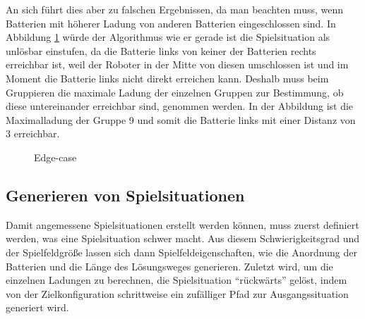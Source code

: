 \documentclass[a4paper,10pt,ngerman]{scrartcl}
\begin{document}
An sich führt dies aber zu falschen Ergebnissen, da man beachten muss, wenn Batterien mit höherer Ladung von anderen Batterien eingeschlossen sind.
In Abbildung \ref{fig:groupingedgecase} würde der Algorithmus wie er gerade ist die Spielsituation als unlösbar einstufen,
da die Batterie links von keiner der Batterien rechts erreichbar ist,
weil der Roboter in der Mitte von diesen umschlossen ist und im Moment die Batterie links nicht direkt erreichen kann.
Deshalb muss beim Gruppieren die maximale Ladung der einzelnen Gruppen zur Bestimmung, ob diese untereinander erreichbar sind, genommen werden.
In der Abbildung ist die Maximalladung der Gruppe 9 und somit die Batterie links mit einer Distanz von 3 erreichbar.

\begin{figure}[ht]
  \centering
  \caption{Edge-case}
  \label{fig:groupingedgecase}
\end{figure}

\subsection{Generieren von Spielsituationen}
Damit angemessene Spielsituationen erstellt werden können, muss zuerst definiert werden, was eine Spielsituation schwer macht.
Aus diesem Schwierigkeitsgrad und der Spielfeldgröße lassen sich dann Spielfeldeigenschaften, wie die Anordnung der Batterien
und die Länge des Lösungsweges generieren. Zuletzt wird, um die einzelnen Ladungen zu berechnen, die Spielsituation
``rückwärts'' gelöst, indem von der Zielkonfiguration schrittweise ein zufälliger Pfad zur Ausgangssituation generiert wird.
\end{document}
